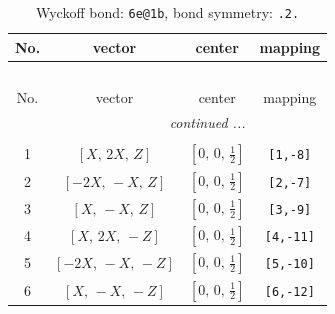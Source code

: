 \documentclass[fleqn,8pt]{jsarticle}
\begin{document}
\renewcommand{\arraystretch}{1.2}
\begin{longtable}{cccc}
\caption{Wyckoff bond: {\tt 6e@1b}, bond symmetry: {\tt .2.}}
 \\
 \hline \hline
No. & vector & center & mapping \\ \hline \endfirsthead

\multicolumn{3}{l}{\tablename\ \thetable{}} \\
 \hline \hline
No. & vector & center & mapping \\ \hline \endhead

 \hline \hline
\multicolumn{3}{r}{\footnotesize\it continued ...} \\ \endfoot

 \hline \hline
\multicolumn{3}{r}{} \\ \endlastfoot

1 & $\left[ X,\, 2 X,\, Z \right]$ & $\left[ 0,\, 0,\, \frac{1}{2} \right]$ & {\tt [1,-8]} \\ \hline
2 & $\left[ - 2 X,\, - X,\, Z \right]$ & $\left[ 0,\, 0,\, \frac{1}{2} \right]$ & {\tt [2,-7]} \\ \hline
3 & $\left[ X,\, - X,\, Z \right]$ & $\left[ 0,\, 0,\, \frac{1}{2} \right]$ & {\tt [3,-9]} \\ \hline
4 & $\left[ X,\, 2 X,\, - Z \right]$ & $\left[ 0,\, 0,\, \frac{1}{2} \right]$ & {\tt [4,-11]} \\ \hline
5 & $\left[ - 2 X,\, - X,\, - Z \right]$ & $\left[ 0,\, 0,\, \frac{1}{2} \right]$ & {\tt [5,-10]} \\ \hline
6 & $\left[ X,\, - X,\, - Z \right]$ & $\left[ 0,\, 0,\, \frac{1}{2} \right]$ & {\tt [6,-12]} \\
\end{longtable}
\renewcommand{\arraystretch}{1.2}
\end{document}
